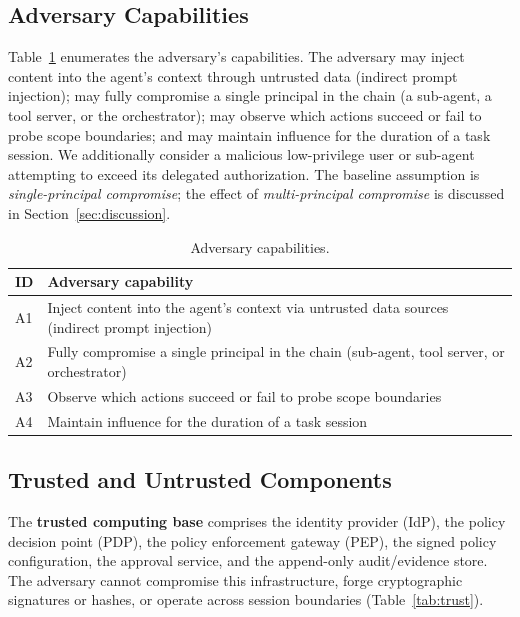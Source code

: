 \documentclass[sigconf,nonacm]{acmart}
\begin{document}
\subsection{Adversary Capabilities}

Table~\ref{tab:adversary} enumerates the adversary's capabilities. The adversary may inject content into the agent's context through untrusted data (indirect prompt injection); may fully compromise a single principal in the chain (a sub-agent, a tool server, or the orchestrator); may observe which actions succeed or fail to probe scope boundaries; and may maintain influence for the duration of a task session. We additionally consider a malicious low-privilege user or sub-agent attempting to exceed its delegated authorization. The baseline assumption is \emph{single-principal compromise}; the effect of \emph{multi-principal compromise} is discussed in Section~\ref{sec:discussion}.

\begin{table}[t]
\centering
\footnotesize
\caption{Adversary capabilities.}
\label{tab:adversary}
\begin{tabularx}{\linewidth}{@{}lX@{}}
\toprule
\textbf{ID} & \textbf{Adversary capability} \\
\midrule
A1 & Inject content into the agent's context via untrusted data sources (indirect prompt injection) \\
A2 & Fully compromise a single principal in the chain (sub-agent, tool server, or orchestrator) \\
A3 & Observe which actions succeed or fail to probe scope boundaries \\
A4 & Maintain influence for the duration of a task session \\
\bottomrule
\end{tabularx}
\end{table}

\subsection{Trusted and Untrusted Components}

The \textbf{trusted computing base} comprises the identity provider (IdP), the policy decision point (PDP), the policy enforcement gateway (PEP), the signed policy configuration, the approval service, and the append-only audit/evidence store. The adversary cannot compromise this infrastructure, forge cryptographic signatures or hashes, or operate across session boundaries (Table~\ref{tab:trust}).
\end{document}
